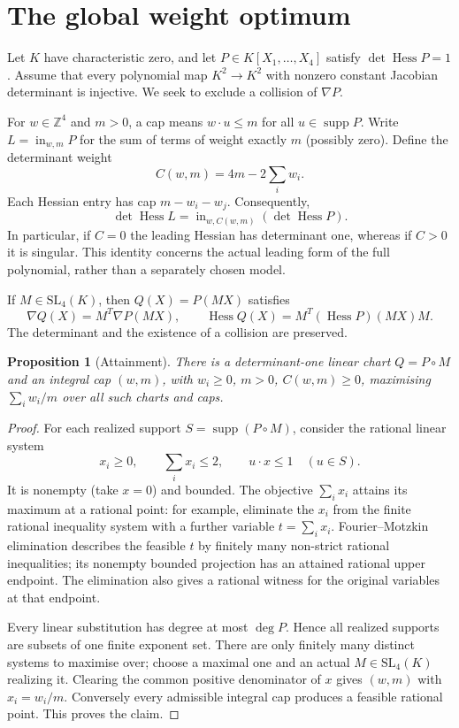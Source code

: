 \documentclass[11pt,a4paper]{article}
\newtheorem{proposition}[theorem]{Proposition}
\newcommand{\Hess}{\operatorname{Hess}}
\newcommand{\supp}{\operatorname{supp}}
\newcommand{\inw}{\operatorname{in}}
\begin{document}
\section{The global weight optimum}\label{sec:weight}
Let $K$ have characteristic zero, and let $P\in K[X_1,\ldots,X_4]$ satisfy $\det\Hess P=1$. Assume that every polynomial map $K^2\to K^2$ with nonzero constant Jacobian determinant is injective. We seek to exclude a collision of $\nabla P$.

For $w\in\mathbb Z^4$ and $m>0$, a cap means $w\cdot u\le m$ for all $u\in\supp P$. Write $L=\inw_{w,m}P$ for the sum of terms of weight exactly $m$ (possibly zero). Define the determinant weight
\[
 C(w,m)=4m-2\sum_i w_i.
\]
Each Hessian entry has cap $m-w_i-w_j$. Consequently,
\begin{equation}\label{eq:det}
 \det\Hess L=\inw_{w,C(w,m)}(\det\Hess P).
\end{equation}
In particular, if $C=0$ the leading Hessian has determinant one, whereas if $C>0$ it is singular. This identity concerns the actual leading form of the full polynomial, rather than a separately chosen model.

If $M\in\mathrm{SL}_4(K)$, then $Q(X)=P(MX)$ satisfies
\[
 \nabla Q(X)=M^T\nabla P(MX),\qquad
 \Hess Q(X)=M^T(\Hess P)(MX)M.
\]
The determinant and the existence of a collision are preserved.

\begin{proposition}[Attainment]\label{prop:attain}
There is a determinant-one linear chart $Q=P\circ M$ and an integral cap $(w,m)$, with $w_i\ge0$, $m>0$, $C(w,m)\ge0$, maximising $\sum_i w_i/m$ over all such charts and caps.
\end{proposition}
\begin{proof}
For each realized support $S=\supp(P\circ M)$, consider the rational linear system
\[
 x_i\ge0,\qquad \sum_i x_i\le2,\qquad
 u\cdot x\le1\quad(u\in S).
\]
It is nonempty (take $x=0$) and bounded. The objective $\sum_i x_i$ attains its maximum at a rational point: for example, eliminate the $x_i$ from the finite rational inequality system with a further variable $t=\sum_i x_i$. Fourier--Motzkin elimination describes the feasible $t$ by finitely many non-strict rational inequalities; its nonempty bounded projection has an attained rational upper endpoint. The elimination also gives a rational witness for the original variables at that endpoint.

Every linear substitution has degree at most $\deg P$. Hence all realized supports are subsets of one finite exponent set. There are only finitely many distinct systems to maximise over; choose a maximal one and an actual $M\in\mathrm{SL}_4(K)$ realizing it. Clearing the common positive denominator of $x$ gives $(w,m)$ with $x_i=w_i/m$. Conversely every admissible integral cap produces a feasible rational point. This proves the claim.
\end{proof}
\end{document}
